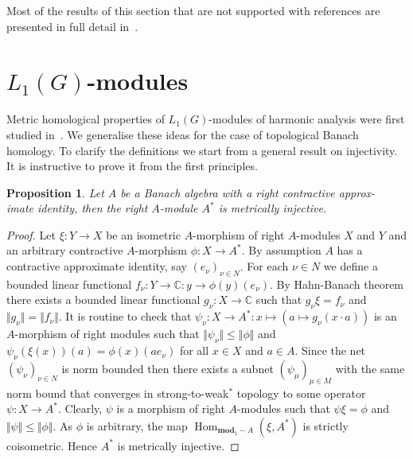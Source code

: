 \documentclass{article}
\theoremstyle{plain}
\newtheorem{proposition}{Proposition}[section]
\theoremstyle{definition}
\newtheorem{proof}{Proof}\def\theproof{}
\begin{document}
\begin{fulltext}
Most of the results of this section that are not supported with references are
presented in full detail in~\cite[section 3.3]{DalBanAlgAutCont}.


\section{\texorpdfstring{$L_1(G)$}{L1(G)}-modules}\label{SubSectionL1GModules}

Metric homological properties of $L_1(G)$-modules of harmonic analysis were
first studied in~\cite{GravInjProjBanMod}. We generalise these ideas for the
case of topological Banach homology. To clarify the definitions we start from a
general result on injectivity. It is instructive to prove it from the first
principles.

\begin{proposition}\label{AlgDualWithApproxIdIsMetrInj} Let $A$ be a Banach
algebra with a right  contractive approx-\\imate identity, then the right
$A$-module $A^*$ is metrically injective. 
\end{proposition}
\begin{proof} Let $\xi:Y\to X$ be an isometric $A$-morphism of right $A$-modules
$X$ and $Y$ and an arbitrary contractive $A$-morphism $\phi: X\to A^*$. By
assumption $A$ has a contractive approximate identity, say ${(e_\nu)}_{\nu\in
N}$. For each $\nu\in N$ we define a bounded linear functional
$f_\nu:Y\to\mathbb{C}:y\to \phi(y)(e_\nu)$. By Hahn-Banach theorem there exists
a bounded linear functional $g_\nu:X\to\mathbb{C}$ such that $g_\nu\xi=f_\nu$
and $\Vert g_\nu\Vert=\Vert f_\nu\Vert$. It is routine to check that $\psi_\nu:
X\to A^*:x\mapsto(a\mapsto g_\nu(x\cdot a))$ is an $A$-morphism of right modules
such that $\Vert\psi_\nu\Vert\leq\Vert\phi\Vert$ and
$\psi_\nu(\xi(x))(a)=\phi(x)(a e_\nu)$ for all $x\in X$ and $a\in A$. Since the
net ${(\psi_\nu)}_{\nu\in N}$ is norm bounded then there exists a subnet
${(\psi_\mu)}_{\mu\in M}$ with the same norm bound that converges in
strong-to-weak${}^*$ topology to some operator $\psi:X\to A^*$. Clearly, $\psi$
is a morphism of right $A$-modules such that $\psi\xi=\phi$ and
$\Vert\psi\Vert\leq\Vert\phi\Vert$. As $\phi$ is arbitrary, the map
$\operatorname{Hom}_{\mathbf{mod}_1-A}(\xi, A^*)$ is strictly coisometric. Hence
$A^*$ is metrically injective.
\end{proof}


\end{fulltext}
\end{document}
